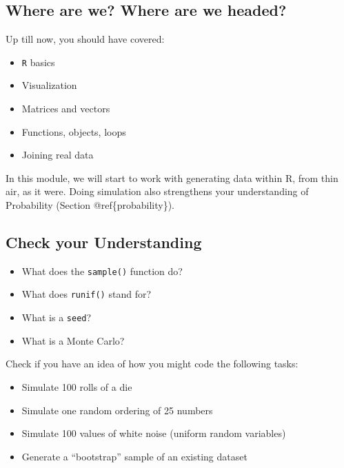 \documentclass[
]{book}
\providecommand{\tightlist}{%
  \setlength{\itemsep}{0pt}\setlength{\parskip}{0pt}}
\theoremstyle{definition}
\theoremstyle{definition}
\theoremstyle{definition}
\theoremstyle{remark}
\begin{document}
\hypertarget{where-are-we-where-are-we-headed-5}{%
\subsection*{Where are we? Where are we headed?}\label{where-are-we-where-are-we-headed-5}}

Up till now, you should have covered:

\begin{itemize}
\tightlist
\item
  \texttt{R} basics
\item
  Visualization
\item
  Matrices and vectors
\item
  Functions, objects, loops
\item
  Joining real data
\end{itemize}

In this module, we will start to work with generating data within R, from thin air, as it were. Doing simulation also strengthens your understanding of Probability (Section @ref\{probability\}).

\hypertarget{check-your-understanding-2}{%
\subsection*{Check your Understanding}\label{check-your-understanding-2}}

\begin{itemize}
\tightlist
\item
  What does the \texttt{sample()} function do?
\item
  What does \texttt{runif()} stand for?
\item
  What is a \texttt{seed}?
\item
  What is a Monte Carlo?
\end{itemize}

Check if you have an idea of how you might code the following tasks:

\begin{itemize}
\tightlist
\item
  Simulate 100 rolls of a die
\item
  Simulate one random ordering of 25 numbers
\item
  Simulate 100 values of white noise (uniform random variables)
\item
  Generate a ``bootstrap'' sample of an existing dataset
\end{itemize}
\end{document}
